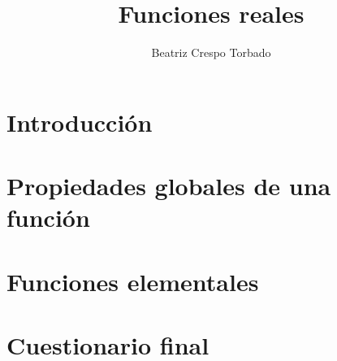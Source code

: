 \documentclass[12pt,a4paper,twoside]{article}
\title{Funciones reales}
\author{Beatriz Crespo Torbado}
\begin{document}
\maketitle

\tableofcontents



\section{Introducción}


\section{Propiedades globales de una función}


\section{Funciones elementales}


\section{Cuestionario final}

\end{document}
